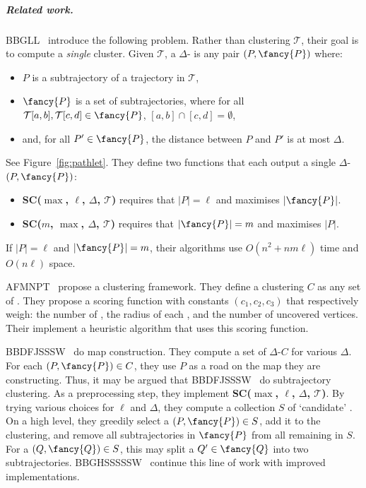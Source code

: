 \documentclass[english, thm-restate]{lipics-v2021}
\begin{document}
\subparagraph{Related work. }
BBGLL~\cite{buchin2011detecting} introduce the following problem. 
Rather than clustering $\mathcal{T}$, their goal is to compute a \emph{single} cluster. Given $\mathcal{T}$,  a $\Delta$-\emph{\pathlet} is any pair $(P, {\fancy{P}})$ where:

\begin{itemize}
    \item $P$ is a subtrajectory of a trajectory in $\mathcal{T}$,
    \item ${\fancy{P}}$ is a set of subtrajectories, where for all $\mathcal{T}[a, b], \mathcal{T}[c, d] \in {\fancy{P}}$, $[a, b] \cap [c, d] = \emptyset$,
    \item and, for all $P' \in {\fancy{P}}$, the \frechet distance between $P$ and $P'$ is at most $\Delta$. 
\end{itemize}

See Figure~\ref{fig:pathlet}.
They define two functions that each output a single $\Delta$-\pathlet $(P, {\fancy{P}})$:

\begin{itemize}
    \item \textbf{SC($\max$, $\ell$, $\Delta$, $\mathcal{T}$)} requires that $|P| = \ell$ and maximises $|{\fancy{P}}|$.
    \item \textbf{SC($m$, $\max$, $\Delta$, $\mathcal{T}$)}  requires  that $|{\fancy{P}}| = m$ and maximises $|P|$. 
\end{itemize}

  If $|P| = \ell$ and $|{\fancy{P}}| = m$, their algorithms use $O(n^2 + n m \ell)$ time and $O(n \ell)$ space.


AFMNPT~\cite{agarwal2018subtrajectory} propose a clustering framework.
They define a clustering $C$ as any set of \pathlets.
They propose a scoring function with constants $(c_1, c_2, c_3)$ that respectively weigh: the number of \pathlets, the radius of each \pathlet, and the number of uncovered vertices. 
Their implement a heuristic algorithm that uses this scoring function.

BBDFJSSSW~\cite{buchin2017clustering} do map construction.
They compute a set of $\Delta$-\pathlets $C$ for various $\Delta$. 
For each $(P, {\fancy{P}}) \in C$, they use $P$ as a road on the map they are constructing. 
Thus, it may be argued that BBDFJSSSW~\cite{buchin2017clustering} do subtrajectory clustering. 
As a preprocessing step, they implement \textbf{SC($\max$, $\ell$, $\Delta$, $\mathcal{T}$)}. By trying various choices for $\ell$ and $\Delta$, they compute a collection $S$ of `candidate' \pathlets. 
On a high level, they greedily select a \pathlet $(P, {\fancy{P}}) \in S$, add it to the clustering, and remove all subtrajectories in ${\fancy{P}}$ from all remaining \pathlets in $S$. For a \pathlet $(Q, {\fancy{Q}}) \in S$, this may split a $Q' \in {\fancy{Q}}$ into two subtrajectories. BBGHSSSSSW~\cite{buchin2020improved} continue this line of work with improved implementations. 
\end{document}
